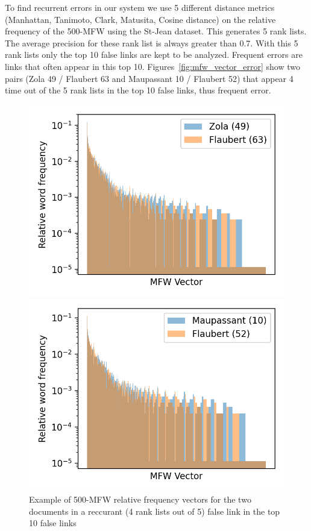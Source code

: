 To find recurrent errors in our system we use 5 different distance metrics (Manhattan, Tanimoto, Clark, Matusita, Cosine distance) on the relative frequency of the 500-MFW using the St-Jean dataset.
This generates 5 rank lists.
The average precision for these rank list is always greater than 0.7.
With this 5 rank lists only the top 10 false links are kept to be analyzed.
Frequent errors are links that often appear in this top 10.
Figures~\ref{fig:mfw_vector_error} show two pairs (Zola 49 / Flaubert 63 and Maupassant 10 / Flaubert 52) that appear 4 time out of the 5 rank lists in the top 10 false links, thus frequent error.

\begin{figure}
  \centering
  \caption{Example of 500-MFW relative frequency vectors for the two documents in a reccurant (4 rank lists out of 5) false link in the top 10 false links}
  \label{fig:mfw_vector_error}

  \label{fig:mfw_vector_error_0}
  \includegraphics[width=\linewidth]{img/mfw_vector_error_0.png}

  \label{fig:mfw_vector_error_1}
  \includegraphics[width=\linewidth]{img/mfw_vector_error_1.png}
\end{figure}

